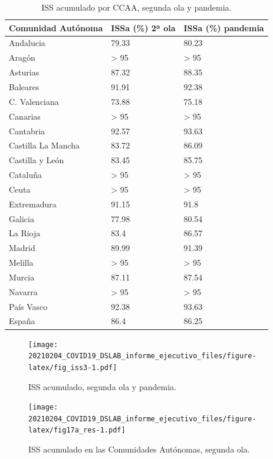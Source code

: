 \documentclass[
  11pt,
]{article}
\begin{document}
\begin{table}[!h]

\caption{\label{tab:tabla}ISS acumulado por CCAA, segunda ola y pandemia.}
\centering
\fontsize{9}{11}\selectfont
\begin{tabular}[t]{l|l|l}
\hline
Comunidad Autónoma & ISSa (\%) 2ª ola & ISSa (\%) pandemia\\
\hline
Andalucia & 79.33 & 80.23\\
\hline
Aragón & > 95 & > 95\\
\hline
Asturias & 87.32 & 88.35\\
\hline
Baleares & 91.91 & 92.38\\
\hline
C. Valenciana & 73.88 & 75.18\\
\hline
Canarias & > 95 & > 95\\
\hline
Cantabria & 92.57 & 93.63\\
\hline
Castilla La Mancha & 83.72 & 86.09\\
\hline
Castilla y León & 83.45 & 85.75\\
\hline
Cataluña & > 95 & > 95\\
\hline
Ceuta & > 95 & > 95\\
\hline
Extremadura & 91.15 & 91.8\\
\hline
Galicia & 77.98 & 80.54\\
\hline
La Rioja & 83.4 & 86.57\\
\hline
Madrid & 89.99 & 91.39\\
\hline
Melilla & > 95 & > 95\\
\hline
Murcia & 87.11 & 87.54\\
\hline
Navarra & > 95 & > 95\\
\hline
País Vasco & 92.38 & 93.63\\
\hline
España & 86.4 & 86.25\\
\hline
\end{tabular}
\end{table}

\begin{figure}
\centering
\texttt{[image: 20210204\_COVID19\_DSLAB\_informe\_ejecutivo\_files/figure-latex/fig\_iss3-1.pdf]}
\caption{\label{fig:fig_iss3} ISS acumulado, segunda ola y pandemia.}
\end{figure}

\vspace{0.2cm}

\begin{figure}
\centering
\texttt{[image: 20210204\_COVID19\_DSLAB\_informe\_ejecutivo\_files/figure-latex/fig17a\_res-1.pdf]}
\caption{\label{fig:fig17a_res} ISS acumulado en las Comunidades
Autónomas, segunda ola.}
\end{figure}
\end{document}
